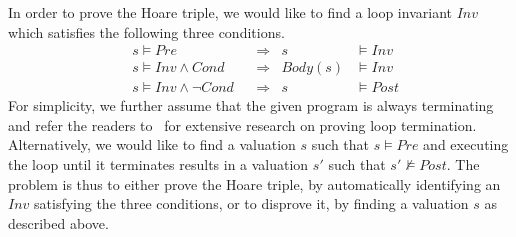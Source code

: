 In order to prove the Hoare triple, we would like to find a loop invariant $\mathit{Inv}$ which satisfies the following three conditions.
\begin{align}
    &s \models \mathit{Pre}
        &&\Longrightarrow & s &\models \mathit{Inv} \label{inv:pre} \\
    &s \models \mathit{Inv} \wedge \mathit{Cond}
        &&\Longrightarrow & \mathit{Body}(s) &\models \mathit{Inv} \label{inv:loop} \\
    &s \models \mathit{Inv} \wedge \neg \mathit{Cond}
        &&\Longrightarrow & s &\models \mathit{Post} \label{inv:post}
\end{align}
For simplicity, we further assume that the given program is always terminating and refer the readers to~\cite{} for extensive research on proving loop termination.
Alternatively, we would like to find a valuation $s$ such that $s \models \mathit{Pre}$ and executing the loop until it terminates results in a valuation $s'$ such that $s' \not \models Post$.
The problem is thus to either prove the Hoare triple, by automatically identifying an $Inv$ satisfying the three conditions, or to disprove it, by finding a valuation $s$ as described above.

